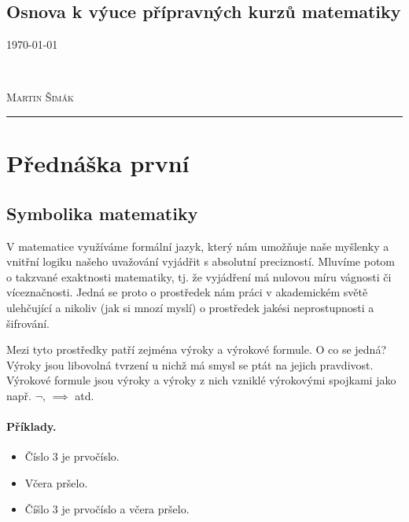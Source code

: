 \documentclass[11pt,a4paper]{article}
\begin{document}


    \begin{center}
        \section*{Osnova k výuce přípravných kurzů matematiky}
        \vspace*{-4mm}
        \begin{minipage}{0.4\textwidth}
            \begin{flushleft}
                \textsc{\today}
            \end{flushleft}
        \end{minipage}
        ~
        \begin{minipage}{0.4\textwidth}
            \begin{flushright}
                \textsc{Martin Šimák}
            \end{flushright}
        \end{minipage}
        \noindent\rule{14.5cm}{0.6pt}
    \end{center}


    \section*{Přednáška první}

        \subsection*{Symbolika matematiky}

            V matematice využíváme formální jazyk, který nám umožňuje naše myšlenky a vnitřní logiku našeho uvažování vyjádřit s absolutní precizností. Mluvíme potom o takzvané exaktnosti matematiky, tj. že vyjádření má nulovou míru vágnosti či víceznačnosti. Jedná se proto o prostředek nám práci v akademickém světě ulehčující a nikoliv (jak si mnozí myslí) o prostředek jakési neprostupnosti a šifrování.
            
            Mezi tyto prostředky patří zejména výroky a výrokové formule. O co se jedná? Výroky jsou libovolná tvrzení u nichž má smysl se ptát na jejich pravdivost. Výrokové formule jsou výroky a výroky z nich vzniklé výrokovými spojkami jako např. $\neg, \, \implies$ atd.
            \paragraph{Příklady.}
            \begin{itemize}
                \item Číslo 3 je prvočíslo.
                \item Včera pršelo.
                \item Číšlo 3 je prvočíslo a včera pršelo.
            \end{itemize}
\end{document}
